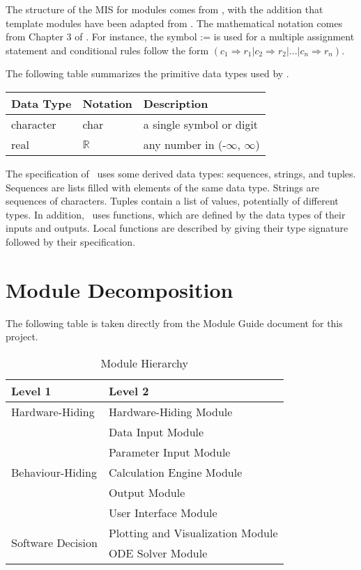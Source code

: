 \documentclass[12pt, titlepage]{article}
\begin{document}
The structure of the MIS for modules comes from \citet{HoffmanAndStrooper1995},
with the addition that template modules have been adapted from \cite{GhezziEtAl2003}.  The mathematical notation comes from Chapter 3 of 
\citet{HoffmanAndStrooper1995}.  For instance, the symbol := is used for a
multiple assignment statement and conditional rules follow the form $(c_1
\Rightarrow r_1 | c_2 \Rightarrow r_2 | ... | c_n \Rightarrow r_n )$.

The following table summarizes the primitive data types used by \progname. 

\begin{center}
\renewcommand{\arraystretch}{1.2}
\noindent 
\begin{tabular}{l l p{7.5cm}} 
\toprule 
\textbf{Data Type} & \textbf{Notation} & \textbf{Description}\\ 
\midrule
character & char & a single symbol or digit\\
real & $\mathbb{R}$ & any number in (-$\infty$, $\infty$)\\
\bottomrule
\end{tabular} 
\end{center}

\noindent
The specification of \progname \ uses some derived data types: sequences, strings, and
tuples. Sequences are lists filled with elements of the same data type. Strings
are sequences of characters. Tuples contain a list of values, potentially of
different types. In addition, \progname \ uses functions, which
are defined by the data types of their inputs and outputs. Local functions are
described by giving their type signature followed by their specification.

\section{Module Decomposition}

The following table is taken directly from the Module Guide document for this project.

\begin{table}[h!]
\centering
\begin{tabular}{p{} p{}}
\toprule
\textbf{Level 1} & \textbf{Level 2}\\
\midrule

{Hardware-Hiding} & Hardware-Hiding Module \\
\midrule

\multirow{5}{0.3\textwidth}{Behaviour-Hiding} & Data Input Module\\
& Parameter Input Module\\
& Calculation Engine Module\\
& Output Module\\
& User Interface Module\\ 
\midrule

\multirow{2}{0.3\textwidth}{Software Decision} & {Plotting and Visualization Module}\\
& ODE Solver Module\\
\bottomrule

\end{tabular}
\caption{Module Hierarchy}
\label{TblMH}
\end{table}
\end{document}
